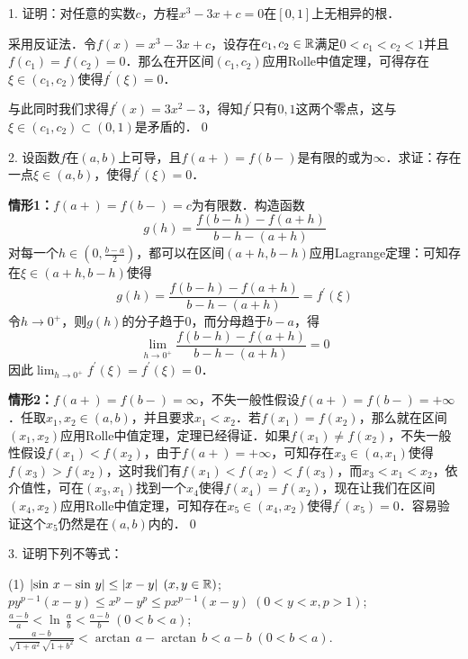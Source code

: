 \exercise

1. 证明：对任意的实数$c$，方程$x^3-3x+c=0$在$[0,1]$上无相异的根．

\prove 采用反证法．令$f(x)=x^3-3x+c$，设存在$c_1, c_2 \in \mathbb{R}$满足$0<c_1<c_2<1$并且$f(c_1)=f(c_2)=0$．那么在开区间$(c_1,c_2)$应用Rolle中值定理，可得存在$\xi \in (c_1,c_2)$使得$f^\prime (\xi)=0$．

与此同时我们求得$f^\prime (x) = 3x^2-3$，得知$f^\prime$只有$0,1$这两个零点，这与$\xi \in (c_1,c_2) \subset (0,1)$是矛盾的．\qed\bigskip

2. 设函数$f$在$(a,b)$上可导，且$f(a+)=f(b-)$是有限的或为$\infty$．求证：存在一点$\xi \in (a,b)$，使得$f^\prime (\xi) = 0$．

\prove 

\textbf{情形1：}$f(a+)=f(b-)=c$为有限数．构造函数
\begin{equation}
    g(h) = \frac{f(b-h)-f(a+h)}{b-h-(a+h)}
\end{equation}
对每一个$h \in (0, \displaystyle\frac{b-a}{2})$，都可以在区间$(a+h,b-h)$应用Lagrange定理：可知存在$\xi \in (a+h,b-h)$使得
\begin{equation}
    g(h) = \frac{f(b-h)-f(a+h)}{b-h-(a+h)} = f^\prime (\xi)
\end{equation}
令$h \to 0^+$，则$g(h)$的分子趋于$0$，而分母趋于$b-a$，得
\begin{equation}
    \lim_{h \to 0^+} \frac{f(b-h)-f(a+h)}{b-h-(a+h)} = 0
\end{equation}
因此$\displaystyle\lim_{h \to 0^+} f^{\prime}(\xi) = f^{\prime}(\xi)= 0$．

\textbf{情形2：}$f(a+)=f(b-)=\infty$，不失一般性假设$f(a+)=f(b-)=+\infty$．任取$x_1, x_2 \in (a,b)$，并且要求$x_1<x_2$．若$f(x_1)=f(x_2)$，那么就在区间$(x_1,x_2)$应用Rolle中值定理，定理已经得证．如果$f(x_1) \neq f(x_2)$，不失一般性假设$f(x_1) < f(x_2)$，由于$f(a+)=+\infty$，可知存在$x_3 \in (a,x_1)$使得$f(x_3)>f(x_2)$，这时我们有$f(x_1) < f(x_2) < f(x_3)$，而$x_3 < x_1 < x_2$，依介值性，可在$(x_3,x_1)$找到一个$x_4$使得$f(x_4)=f(x_2)$，现在让我们在区间$(x_4,x_2)$应用Rolle中值定理，可知存在$x_5 \in (x_4,x_2)$使得$f^\prime (x_5) = 0$．容易验证这个$x_5$仍然是在$(a,b)$内的．\qed\bigskip

3. 证明下列不等式：
\begin{tasks}(1)
    \task $\lvert \sin \, x - \sin \, y \rvert \leq \lvert x - y \rvert \; \left(x, y \in \mathbb{R} \right)$;
    \task $py^{p-1}\left(x-y\right)\leq x^p - y^p \leq px^{p-1}\left(x-y\right) \; (0 < y < x, p > 1)$;
    \task $\displaystyle\frac{a-b}{a}<\ln \, \displaystyle\frac{a}{b} < \displaystyle\frac{a-b}{b} \; (0<b<a)$;
    \task $\displaystyle\frac{a-b}{\sqrt{1+a^2}\sqrt{1+b^2}} < \arctan \, a - \arctan \, b < a-b \; (0 < b < a)$.
\end{tasks}

